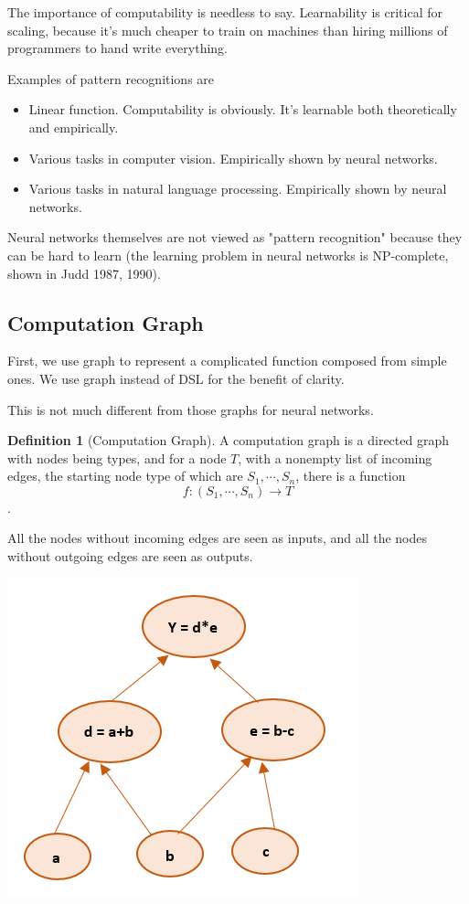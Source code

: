 \documentclass[11pt, oneside]{article}   	%
\theoremstyle{definition}
\newtheorem*{defn}{Definition}
\begin{document}
The importance of computability is needless to say. Learnability is critical for scaling, because it's much cheaper to train on machines than hiring millions of programmers to hand write everything.

Examples of pattern recognitions are

\begin{itemize}
	\item Linear function. Computability is obviously. It's learnable both theoretically and empirically.
	\item Various tasks in computer vision. Empirically shown by neural networks.
	\item Various tasks in natural language processing. Empirically shown by neural networks.
\end{itemize}

Neural networks themselves are not viewed as "pattern recognition" because they can be hard to learn (the learning problem in neural networks is NP-complete, shown in Judd 1987, 1990).

\subsection{Computation Graph}


First, we use graph to represent a complicated function composed from simple ones. We use graph instead of DSL for the benefit of clarity.

This is not much different from those graphs for neural networks.

\begin{defn}[Computation Graph]
A computation graph is a directed graph with nodes being types, and for a node $T$, with a nonempty list of incoming edges, the starting node type of which are $S_1,\cdots,S_n$, there is a function $$f: (S_1,\cdots,S_n)\to T$$.
\end{defn}

All the nodes without incoming edges are seen as inputs, and all the nodes without outgoing edges are seen as outputs.

\includegraphics{computation_graph.png}
\end{document}
